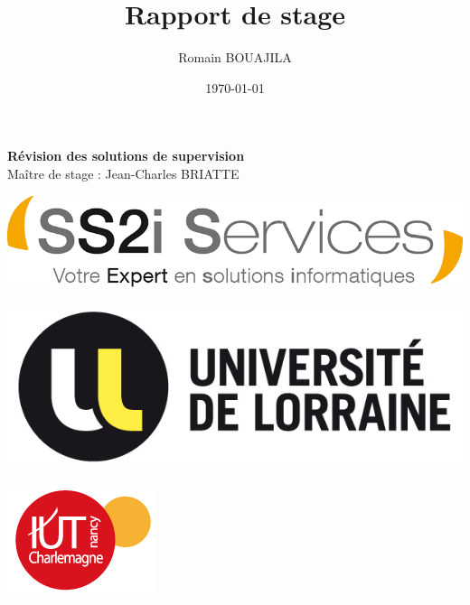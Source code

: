 \documentclass{article}
\title{\textbf{Rapport de stage}}
\author{Romain BOUAJILA}
\date{\today}
\begin{document}
	\maketitle

	\begin{center}
		\Large{\textbf{Révision des solutions de supervision}}\\
		\normalsize{Maître de stage : Jean-Charles BRIATTE}
	\end{center}

	\vspace{1cm}

	\begin{center}
		\includegraphics[scale=0.6]{logoSS2i.png}
	\end{center}

	\vspace{0.5cm}

	\begin{center}
		\includegraphics[scale=1.5]{logoUniv0.jpg}
	\end{center}

	\vspace{0.2cm}
	
	\begin{center}
		\includegraphics[scale=0.9]{logoIut2.png}
	\end{center}

	\newpage
\end{document}
